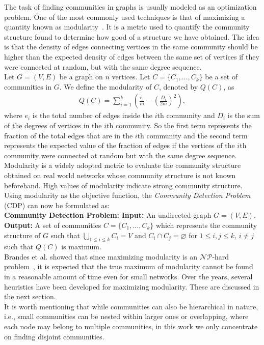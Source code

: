 \begin{spacing}{1.5}
\indent The task of finding communities in graphs is usually modeled as an optimization problem. One of the most commonly used techniques is that of maximizing a quantity known as modularity~\cite{PhysRevE.69.026113}. It is a metric used to quantify the community structure found to determine how good of a structure we have obtained. The idea is that the density of edges connecting vertices in the same community should be higher than the expected density of edges between the same set of vertices if they were connected at random, but with the same degree sequence.\\
\indent Let $G=(V, E)$ be a graph on $n$ vertices. Let $C = \{C_1,\ldots,C_k\}$ be a set of communities in $G$. We define the modularity of $C$, denoted by $Q(C)$, as
\begin{align}
Q(C) = \displaystyle\sum_{i = 1}^k\left(\frac{e_i}{m} - \left(\frac{D_i}{2m}\right)^2\right),
\end{align}
where $e_i$ is the total number of edges inside the $i$th community and $D_i$ is the sum of the degrees of vertices in the $i$th community. So the first term represents the fraction of the total edges that are in the $i$th community and the second term represents the expected value of the fraction of edges if the vertices of the $i$th community were connected at random but with the same degree sequence.\\
\indent Modularity is a widely adopted metric to evaluate the community structure obtained on real world networks whose community structure is not known beforehand. High values of modularity indicate strong community structure. Using modularity as the objective function, the \emph{Community Detection Problem} (CDP) can now be formulated as:\\[5mm]
{\bfseries Community Detection Problem:}
\newline
\noindent \textbf{Input: }An undirected graph $G = (V, E)$.
\newline
\noindent \textbf{Output: }A set of communities $C = \{C_1, \ldots, C_k\}$ which represents the community structure of $G$ such that $\bigcup\limits_{1\leq i\leq k}C_i = V$ and $C_i\cap C_j = \varnothing$ for $1\leq i,j\leq k$, $i\neq j$ such that $Q(C)$ is maximum.\\[5mm]
\indent Brandes et al. showed that since maximizing modularity is an $\mathcal{NP}$-hard problem~\cite{10.1109/TKDE.2007.190689}, it is expected that the true maximum of modularity cannot be found in a reasonable amount of time even for small networks. Over the years, several heuristics have been developed for maximizing modularity. These are discussed in the next section.\\
\indent It is worth mentioning that while communities can also be hierarchical in nature, i.e., small communities can be nested within larger ones or overlapping, where each node may belong to multiple communities, in this work we only concentrate on finding disjoint communities. %

\end{spacing}
